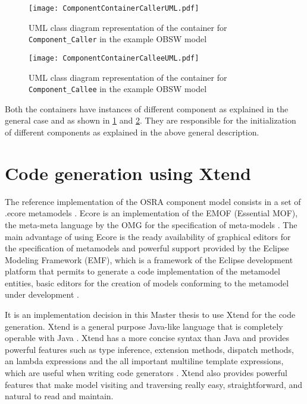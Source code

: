 \begin{figure}[h]
	\centering
	\texttt{[image: ComponentContainerCallerUML.pdf]}
	\caption{UML class diagram representation of the container for \texttt{Component\allowbreak \_Caller} in the example OBSW model}
	\label{fig: Component container caller UML}
\end{figure}

\begin{figure}[h]
	\centering
	\texttt{[image: ComponentContainerCalleeUML.pdf]}
	\caption{UML class diagram representation of the container for \texttt{Component\allowbreak \_Callee} in the example OBSW model}
	\label{fig: Component container callee UML}
\end{figure}

Both the containers have instances of different component as explained in the general case and as shown in \cref{fig: Component container caller UML} and \cref{fig: Component container callee UML}. They are responsible for the initialization of different components as explained in the above general description.  

\section{Code generation using Xtend}
\label{section: code generation}
The reference implementation of the OSRA component model consists in a set of .ecore metamodels \cite{SpecMetamodel}. Ecore is an implementation of the EMOF (Essential MOF), the meta-meta language by the OMG for the specification of meta-models \cite{SpecMetamodel}. The main advantage of using Ecore is the ready availability of graphical editors for the specification of metamodels and powerful support provided by the Eclipse Modeling Framework (EMF), which is a framework of the Eclipse development platform that permits to generate a code implementation of the metamodel entities, basic editors for the creation of models conforming to the metamodel under development \cite{SpecMetamodel}. 

It is an implementation decision in this Master thesis to use Xtend for the code generation. Xtend is a general purpose Java-like language that is completely operable with Java \cite{Xtend,XtendDoc}. Xtend has a more concise syntax than Java and provides powerful features such as type inference, extension methods, dispatch methods, an lambda expressions and the all important multiline template expressions, which are useful when writing code generators \cite{Xtend,XtendDoc}. Xtend also provides powerful features that make model visiting and traversing really easy, straightforward, and natural to read and maintain. 

